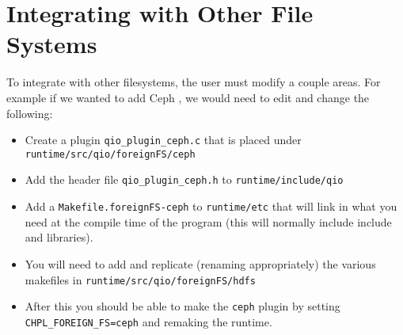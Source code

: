 \section{Integrating with Other File Systems}\label{s:OFS}

To integrate with other filesystems, the user must modify a couple areas. For
example if we wanted to add Ceph \cite{ceph}, we would need to edit and change the following:
\begin{itemize}
\item Create a plugin {\tt qio\_plugin\_ceph.c} that is placed under {\tt runtime/src/qio/foreignFS/ceph}
\item Add the header file {\tt qio\_plugin\_ceph.h} to {\tt runtime/include/qio}
\item Add a {\tt Makefile.foreignFS-ceph} to {\tt runtime/etc} that will link in what you need at the compile time of the program (this will normally include include and libraries).
\item You will need to add and replicate (renaming appropriately)  the various
makefiles in {\tt runtime/src/qio/foreignFS/hdfs}
\item After this you should be able to make the {\tt ceph} plugin by setting {\tt
CHPL\_FOREIGN\_FS=ceph} and remaking the runtime.
\end{itemize}


